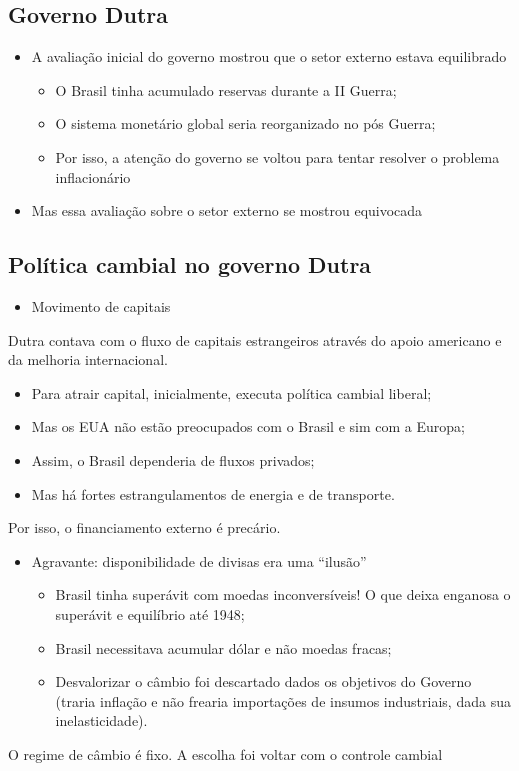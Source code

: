 \documentclass[a4paper,12pt]{article}[abntex2]
\begin{document}
\subsection{Governo Dutra}
\begin{itemize}
    \item A avaliação inicial do governo mostrou que o setor externo estava equilibrado 
    \begin{itemize}
        \item  O Brasil tinha acumulado reservas durante a II Guerra;
        \item O sistema monetário global seria reorganizado no pós Guerra;
        \item Por isso, a atenção do governo se voltou para tentar resolver o problema inflacionário
    \end{itemize}
    \item Mas essa avaliação sobre o setor externo se mostrou equivocada
\end{itemize}

\subsection{Política cambial no governo Dutra}
\begin{itemize}
    \item Movimento de capitais 
\end{itemize}
Dutra contava com o fluxo de capitais estrangeiros através do apoio americano e da melhoria internacional. 
\begin{itemize}
    \begin{itemize}
        \item Para atrair capital, inicialmente, executa política cambial liberal;
        \item Mas os EUA não estão preocupados com o Brasil e sim com a Europa;
        \item Assim, o Brasil dependeria de fluxos privados;
        \item Mas há fortes estrangulamentos de energia e de transporte.
    \end{itemize}
\end{itemize}
Por isso, o financiamento externo é precário.

\begin{itemize}
    \item Agravante: disponibilidade de divisas era uma “ilusão”
    \begin{itemize}
        \item Brasil tinha superávit com moedas inconversíveis! O que deixa enganosa o superávit e equilíbrio até 1948;
        \item Brasil necessitava acumular dólar e não moedas fracas;
        \item Desvalorizar o câmbio foi descartado dados os objetivos do Governo (traria inflação e não frearia importações de insumos industriais, dada sua inelasticidade).


    \end{itemize}\end{itemize}
    O regime de câmbio é fixo. A escolha foi voltar com o controle cambial
\end{document}
